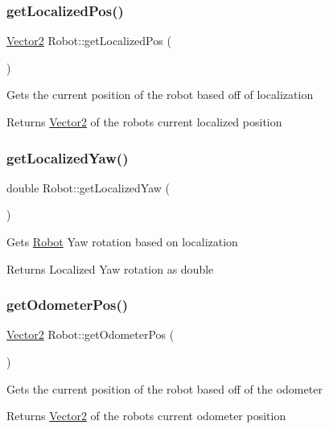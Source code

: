 \subsubsection{\texorpdfstring{get\+Localized\+Pos()}{getLocalizedPos()}}
{\footnotesize\ttfamily \hyperlink{structVector2}{Vector2} Robot\+::get\+Localized\+Pos (\begin{DoxyParamCaption}{ }\end{DoxyParamCaption})}

Gets the current position of the robot based off of localization \begin{DoxyReturn}{Returns}
\hyperlink{structVector2}{Vector2} of the robot\textquotesingle{}s current localized position 
\end{DoxyReturn}
\mbox{\label{classRobot_a7c0ff2fc5e195e8e8aaf566cfca78db9}} 
\subsubsection{\texorpdfstring{get\+Localized\+Yaw()}{getLocalizedYaw()}}
{\footnotesize\ttfamily double Robot\+::get\+Localized\+Yaw (\begin{DoxyParamCaption}{ }\end{DoxyParamCaption})}

Gets \hyperlink{classRobot}{Robot} Yaw rotation based on localization \begin{DoxyReturn}{Returns}
Localized Yaw rotation as double 
\end{DoxyReturn}
\mbox{\label{classRobot_a3d023c3f1c9f775711cf2e86cc9798f0}} 
\subsubsection{\texorpdfstring{get\+Odometer\+Pos()}{getOdometerPos()}}
{\footnotesize\ttfamily \hyperlink{structVector2}{Vector2} Robot\+::get\+Odometer\+Pos (\begin{DoxyParamCaption}{ }\end{DoxyParamCaption})}

Gets the current position of the robot based off of the odometer \begin{DoxyReturn}{Returns}
\hyperlink{structVector2}{Vector2} of the robot\textquotesingle{}s current odometer position 
\end{DoxyReturn}
\mbox{\label{classRobot_a3b0bee526dcdfd730e919abd4f3898b1}} 
